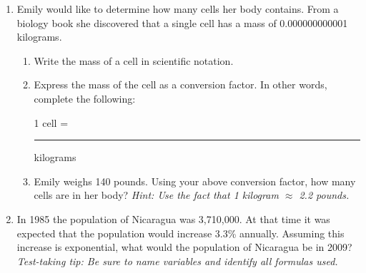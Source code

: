 \documentclass[12pt]{article}
\begin{document}
\begin{enumerate}
\newpage


\item  Emily would like to determine how many cells her body contains.  From a biology book she discovered that a single cell has a mass of 0.000000000001 kilograms.  

\begin{enumerate}
\item Write the mass of a cell in scientific notation.
\vfill
\item Express the mass of the cell as a conversion factor.  In other words, complete the following:
\vspace{0.2in}
\begin{center} 1 cell = \rule{1.5in}{.01in} kilograms \end{center}
\vspace{0.2in}

\item Emily weighs 140 pounds. Using your above conversion factor, how many cells are in her body?  \emph{Hint: Use the fact that 1 kilogram $\approx$ 2.2 pounds.}
\vfill



\end{enumerate}


\item In 1985 the population of Nicaragua was 3,710,000. At that time it was expected that the population would increase 3.3\% annually.  Assuming this increase is exponential, what would the population of Nicaragua be in 2009?  \emph{Test-taking tip: Be sure to name variables and identify all formulas used.}


\vfill



\end{enumerate}
\end{document}
